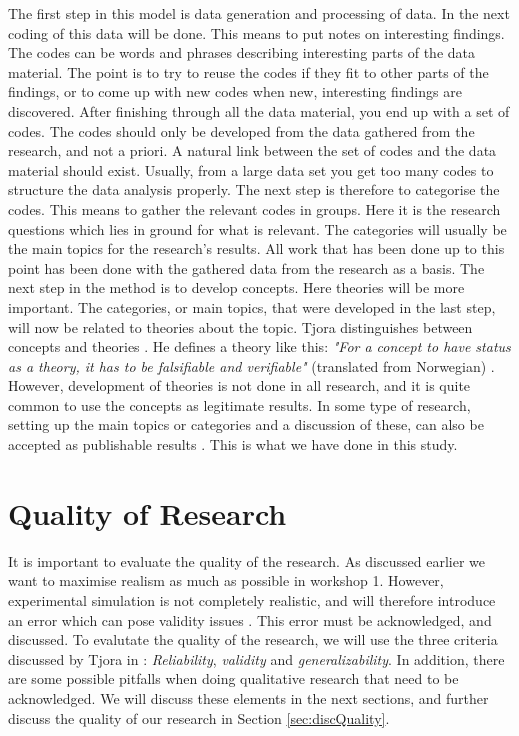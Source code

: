 The first step in this model is data generation and processing of data. In the next coding of this data will be done. This means to put notes on interesting findings. The codes can be words and phrases describing interesting parts of the data material. The point is to try to reuse the codes if they fit to other parts of the findings, or to come up with new codes when new, interesting findings are discovered. After finishing through all the data material, you end up with a set of codes. The codes should only be developed from the data gathered from the research, and not a priori. A natural link between the set of codes and the data material should exist. Usually, from a large data set you get too many codes to structure the data analysis properly. The next step is therefore to categorise the codes. This means to gather the relevant codes in groups. Here it is the research questions which lies in ground for what is relevant. The categories will usually be the main topics for the research's results. All work that has been done up to this point has been done with the gathered data from the research as a basis. The next step in the method is to develop concepts. Here theories will be more important. The categories, or main topics, that were developed in the last step, will now be related to theories about the topic. Tjora distinguishes between concepts and theories \cite{tjora}. He defines a theory like this: \emph{"For a concept to have status as a theory, it has to be falsifiable and verifiable"} (translated from Norwegian) \cite{tjora}. However, development of theories is not done in all research, and it is quite common to use the concepts as legitimate results. In some type of research, setting up the main topics or categories and a discussion of these, can also be accepted as publishable results \cite{tjora}. This is what we have done in this study. 

\section{Quality of Research}
\label{sec:qualityresearch}
It is important to evaluate the quality of the research. As discussed earlier we want to maximise realism as much as possible in workshop 1. However, experimental simulation is not completely realistic, and will therefore introduce an error which can pose validity issues \cite{alsos}.  This error must be acknowledged, and discussed. To evalutate the quality of the research, we will use the three criteria discussed by Tjora in \cite{tjora}:  \emph{Reliability}, \emph{validity} and \emph{generalizability}. In addition, there are some possible pitfalls when doing qualitative research that need to be acknowledged. We will discuss these elements in the next sections, and further discuss the quality of our research in Section \ref{sec:discQuality}.

